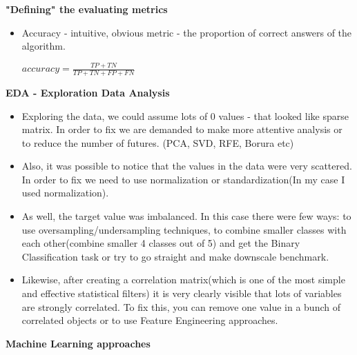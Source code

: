 \documentclass[12pt]{article}
\begin{document}
\newpage
\textbf{"Defining" the evaluating metrics}\newline
\begin{itemize}
  \item Accuracy - intuitive, obvious metric - the proportion of correct answers of the algorithm.\newline
  
  $accuracy = \frac{TP + TN}{TP + TN + FP + FN}$\newline
\end{itemize}

\textbf{EDA - Exploration Data Analysis}\newline
\begin{itemize}
\item Exploring the data, we could assume lots of 0 values - that looked like sparse matrix. In order to fix we are demanded to make more attentive analysis or to reduce the number of futures. (PCA, SVD, RFE, Borura etc)\newline
\item Also, it was possible to notice that the values in the data were very scattered. In order to fix we need to use normalization or standardization(In my case I used normalization). 
\item As well, the target value was imbalanced. In this case there were few ways: to use oversampling/undersampling techniques, to combine smaller classes with each other(combine smaller 4 classes out of 5) and get the Binary Classification task or try to go straight and make downscale benchmark. 
\item Likewise, after creating a correlation matrix(which is one of the most simple and effective statistical filters) it is very clearly visible that lots of variables are strongly correlated. To fix this, you can remove one value in a bunch of correlated objects or to use Feature Engineering approaches. 
\end{itemize}
\newpage
\textbf{Machine Learning approaches}\newline 
\end{document}
